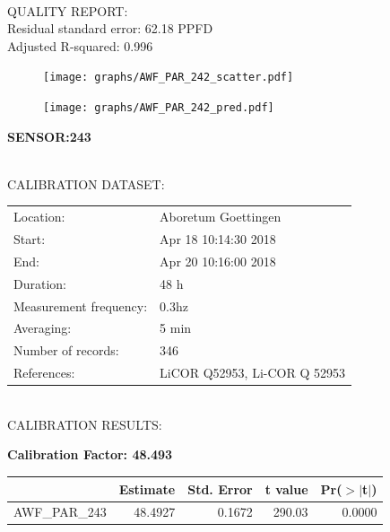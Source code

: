 \documentclass[oneside]{report}
\begin{document}
\hrulefill\\
QUALITY REPORT:\\
Residual standard error: 62.18 PPFD\\
Adjusted R-squared: 0.996



\begin{figure}[H]
  \centering
  \texttt{[image: graphs/AWF\_PAR\_242\_scatter.pdf]}
\end{figure}




\begin{figure}[H]
  \centering
  \texttt{[image: graphs/AWF\_PAR\_242\_pred.pdf]}
\end{figure}

\pagebreak


\begin{center}
\large{\textbf{SENSOR:243}}\\
\end{center}

\hrulefill\\
CALIBRATION DATASET:\\
\begin{table}[h!]
  \centering
  \label{tab:table1}
  \begin{tabular}{ll}
    Location: & Aboretum Goettingen\\ 
    
    
    Start:  & Apr 18 10:14:30 2018 \\
    End:   & Apr 20 10:16:00 2018\\ 
    Duration: & 48 h\\
    Measurement frequency: & 0.3hz\\
    Averaging:  &5 min\\
    Number of records: & 346 \\
    References: & LiCOR Q52953, Li-COR Q 52953 \\
  \end{tabular}
\end{table}

\hrulefill\\
CALIBRATION RESULTS:\\


\begin{center}
\textbf{\large{Calibration Factor: 48.493}}\\
\end{center}
\begin{table}[ht]
\centering
\begin{tabular}{rrrrr}
  \hline
 & Estimate & Std. Error & t value & Pr($>$$|$t$|$) \\ 
  \hline
AWF\_PAR\_243 & 48.4927 & 0.1672 & 290.03 & 0.0000 \\ 
   \hline
\end{tabular}
\end{table}
\end{document}
